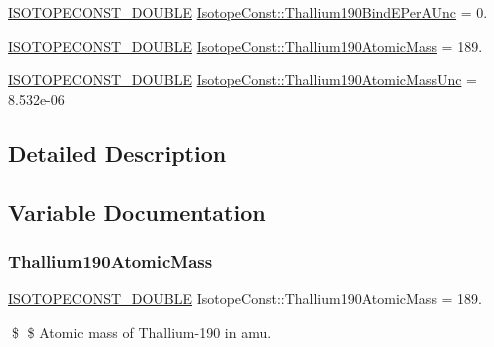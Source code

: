 \begin{DoxyCompactItemize}
\mbox{\hyperlink{group___isotope_const-_macros_ga8f45a7272ce02c0b4c65c44636ed719a}{I\+S\+O\+T\+O\+P\+E\+C\+O\+N\+S\+T\+\_\+\+D\+O\+U\+B\+LE}} \mbox{\hyperlink{group___isotope_const-_thallium-_tl190_gad2ae976c93f090fa969c4d359e6d6188}{Isotope\+Const\+::\+Thallium190\+Bind\+E\+Per\+A\+Unc}} = 0.
\item 
\mbox{\hyperlink{group___isotope_const-_macros_ga8f45a7272ce02c0b4c65c44636ed719a}{I\+S\+O\+T\+O\+P\+E\+C\+O\+N\+S\+T\+\_\+\+D\+O\+U\+B\+LE}} \mbox{\hyperlink{group___isotope_const-_thallium-_tl190_gaea62003fc15530b7cc92d9ca00b6c8bb}{Isotope\+Const\+::\+Thallium190\+Atomic\+Mass}} = 189.
\item 
\mbox{\hyperlink{group___isotope_const-_macros_ga8f45a7272ce02c0b4c65c44636ed719a}{I\+S\+O\+T\+O\+P\+E\+C\+O\+N\+S\+T\+\_\+\+D\+O\+U\+B\+LE}} \mbox{\hyperlink{group___isotope_const-_thallium-_tl190_ga6f83baedd87535f55f3aa451e5d92401}{Isotope\+Const\+::\+Thallium190\+Atomic\+Mass\+Unc}} = 8.\+532e-\/06
\end{DoxyCompactItemize}


\subsection{Detailed Description}


\subsection{Variable Documentation}
\mbox{\label{group___isotope_const-_thallium-_tl190_gaea62003fc15530b7cc92d9ca00b6c8bb}} 
\subsubsection{\texorpdfstring{Thallium190\+Atomic\+Mass}{Thallium190AtomicMass}}
{\footnotesize\ttfamily \mbox{\hyperlink{group___isotope_const-_macros_ga8f45a7272ce02c0b4c65c44636ed719a}{I\+S\+O\+T\+O\+P\+E\+C\+O\+N\+S\+T\+\_\+\+D\+O\+U\+B\+LE}} Isotope\+Const\+::\+Thallium190\+Atomic\+Mass = 189.}

\$ \$ Atomic mass of Thallium-\/190 in amu. \mbox{\label{group___isotope_const-_thallium-_tl190_ga6f83baedd87535f55f3aa451e5d92401}} 
